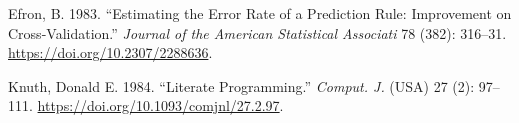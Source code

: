 \documentclass[
  letterpaper,
  DIV=11,
  numbers=noendperiod]{scrreprt}
\newlength{\cslhangindent}
\newenvironment{CSLReferences}[2] %
 {\begin{list}{}{%
  \setlength{\itemindent}{0pt}
  \setlength{\leftmargin}{0pt}
  \setlength{\parsep}{0pt}
  \ifodd #1
   \setlength{\leftmargin}{\cslhangindent}
   \setlength{\itemindent}{-1\cslhangindent}
  \fi
  \setlength{\itemsep}{#2\baselineskip}}}
 {\end{list}}
\begin{document}

\protect{}\label{refs}
\begin{CSLReferences}{1}{1}
Efron, B. 1983. {``Estimating the Error Rate of a Prediction Rule:
Improvement on Cross-Validation.''} \emph{Journal of the American
Statistical Associati} 78 (382): 316--31.
\url{https://doi.org/10.2307/2288636}.

Knuth, Donald E. 1984. {``Literate Programming.''} \emph{Comput. J.}
(USA) 27 (2): 97--111. \url{https://doi.org/10.1093/comjnl/27.2.97}.

\end{CSLReferences}
\end{document}
